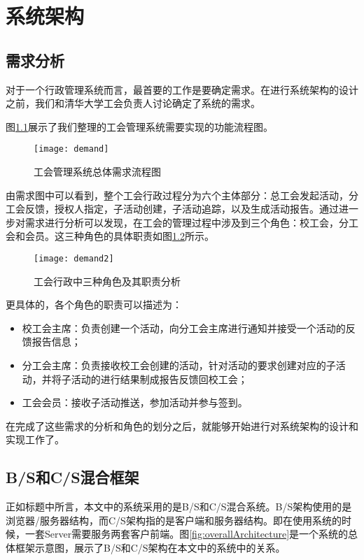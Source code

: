 
\chapter{系统架构}

\section{需求分析}

\label{requireAnalysis}

对于一个行政管理系统而言，最首要的工作是要确定需求。在进行系统架构的设计之前，我们和清华大学工会负责人讨论确定了系统的需求。

图\ref{fig:demand}展示了我们整理的工会管理系统需要实现的功能流程图。

\begin{figure}[H]
  \centering
  \texttt{[image: demand]}
  \caption{工会管理系统总体需求流程图}
  \label{fig:demand}
\end{figure}

由需求图中可以看到，整个工会行政过程分为六个主体部分：总工会发起活动，分工会反馈，授权人指定，子活动创建，子活动追踪，以及生成活动报告。通过进一步对需求进行分析可以发现，在工会的管理过程中涉及到三个角色：校工会，分工会和会员。这三种角色的具体职责如图\ref{fig:demand2}所示。

\begin{figure}[H]
  \centering
  \texttt{[image: demand2]}
  \caption{工会行政中三种角色及其职责分析}
  \label{fig:demand2}
\end{figure}

更具体的，各个角色的职责可以描述为：

\begin{itemize}
	\item 校工会主席：负责创建一个活动，向分工会主席进行通知并接受一个活动的反馈报告信息；
	\item 分工会主席：负责接收校工会创建的活动，针对活动的要求创建对应的子活动，并将子活动的进行结果制成报告反馈回校工会；
	\item 工会会员：接收子活动推送，参加活动并参与签到。
\end{itemize}

在完成了这些需求的分析和角色的划分之后，就能够开始进行对系统架构的设计和实现工作了。

\section{B/S和C/S混合框架}

正如标题中所言，本文中的系统采用的是B/S和C/S混合系统。B/S架构使用的是浏览器/服务器结构，而C/S架构指的是客户端和服务器结构。即在使用系统的时候，一套Server需要服务两套客户前端。图\ref{fig:overallArchitecture}是一个系统的总体框架示意图，展示了B/S和C/S架构在本文中的系统中的关系。

